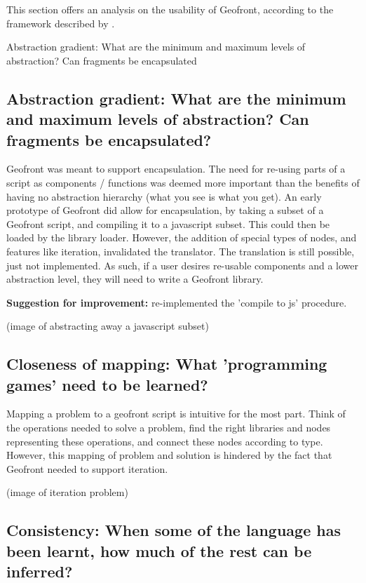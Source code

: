 This section offers an analysis on the usability of Geofront, according to the framework described by \cite[]{green_usability_1996}.

Abstraction gradient: What are the minimum and maximum levels of abstraction? Can fragments be encapsulated

\subsection*{Abstraction gradient: What are the minimum and maximum levels of abstraction? Can fragments be encapsulated?}

Geofront was meant to support encapsulation. 
The need for re-using parts of a script as components / functions was deemed more important than the benefits of having no abstraction hierarchy (what you see is what you get).
An early prototype of Geofront did allow for encapsulation, by taking a subset of a Geofront script, and compiling it to a javascript subset. This could then be loaded by the library loader. 
However, the addition of special types of nodes, and features like iteration, invalidated the  translator.
The translation is still possible, just not implemented.  
As such, if a user desires re-usable components and a lower abstraction level, they will need to write a Geofront library.

\textbf{Suggestion for improvement:} re-implemented the 'compile to js' procedure.

(image of abstracting away a javascript subset)



\subsection*{Closeness of mapping: What 'programming games' need to be learned?}

Mapping a problem to a geofront script is intuitive for the most part.
Think of the operations needed to solve a problem, 
find the right libraries and nodes representing these operations,
and connect these nodes according to type. 
However, this mapping of problem and solution is hindered by the fact that Geofront needed to support iteration. 

(image of iteration problem)



\subsection*{Consistency: When some of the language has been learnt, how much of the rest can be inferred?}

